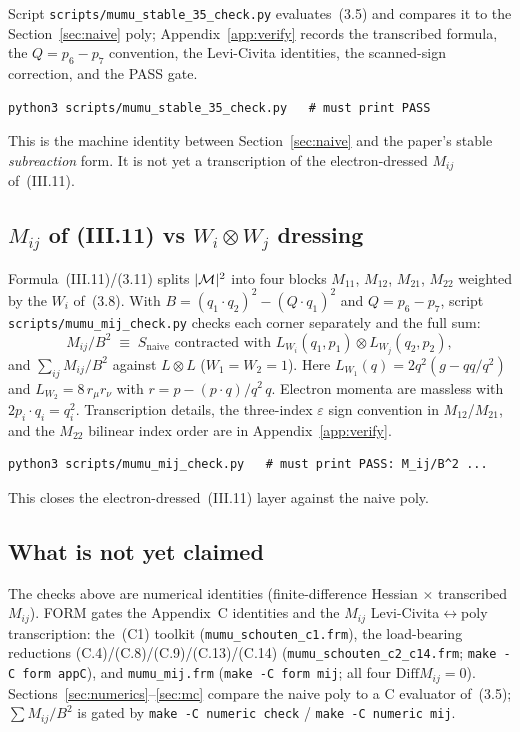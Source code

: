 \documentclass[11pt]{article}
\begin{document}
Script \texttt{scripts/mumu\_stable\_35\_check.py} evaluates~(3.5) and
compares it to the Section~\ref{sec:naive} poly; Appendix~\ref{app:verify}
records the transcribed formula, the $Q=p_6-p_7$ convention, the
Levi-Civita identities, the scanned-sign correction, and the PASS gate.
\begin{verbatim}
python3 scripts/mumu_stable_35_check.py   # must print PASS
\end{verbatim}
This is the machine identity between Section~\ref{sec:naive} and the
paper's stable \emph{subreaction} form. It is not yet a transcription of
the electron-dressed $M_{ij}$ of~(III.11).

\subsection{$M_{ij}$ of (III.11) vs $W_i\otimes W_j$ dressing}
\label{sec:M11-check}

Formula~(III.11)/(3.11) splits $|{\cal M}|^2$ into four blocks
$M_{11}$, $M_{12}$, $M_{21}$, $M_{22}$ weighted by the $W_i$ of~(3.8).
With $B=(q_1{\cdot}q_2)^2-(Q{\cdot}q_1)^2$ and $Q=p_6-p_7$, script
\texttt{scripts/mumu\_mij\_check.py} checks each corner separately and
the full sum:
\begin{equation}
  M_{ij}/B^2
  \;\equiv\;
  S_{\mathrm{naive}}
  \text{ contracted with }
  L_{W_i}(q_1,p_1)\otimes L_{W_j}(q_2,p_2),
\end{equation}
and $\sum_{ij}M_{ij}/B^2$ against $L\otimes L$ ($W_1=W_2=1$).
Here $L_{W_1}(q)=2q^2(g-qq/q^2)$ and $L_{W_2}=8\,r_\mu r_\nu$ with
$r=p-(p{\cdot}q)/q^2\,q$. Electron momenta are massless with
$2p_i{\cdot}q_i=q_i^2$. Transcription details, the three-index $\varepsilon$
sign convention in $M_{12}$/$M_{21}$, and the $M_{22}$ bilinear index
order are in Appendix~\ref{app:verify}.
\begin{verbatim}
python3 scripts/mumu_mij_check.py   # must print PASS: M_ij/B^2 ...
\end{verbatim}
This closes the electron-dressed~(III.11) layer against the naive poly.

\subsection{What is not yet claimed}
\label{sec:form-not-claimed}

The checks above are numerical identities (finite-difference Hessian
$\times$ transcribed $M_{ij}$). FORM gates the Appendix~C identities and
the $M_{ij}$ Levi-Civita$\leftrightarrow$poly transcription: the~(C1)
toolkit (\texttt{mumu\_schouten\_c1.frm}), the load-bearing reductions
(C.4)/(C.8)/(C.9)/(C.13)/(C.14)
(\texttt{mumu\_schouten\_c2\_c14.frm}; \texttt{make -C form appC}), and
\texttt{mumu\_mij.frm} (\texttt{make -C form mij}; all four
$\mathrm{Diff}M_{ij}=0$). Sections~\ref{sec:numerics}--\ref{sec:mc}
compare the naive poly to a C evaluator of~(3.5); $\sum M_{ij}/B^2$ is
gated by \texttt{make -C numeric check} / \texttt{make -C numeric mij}.
\end{document}
